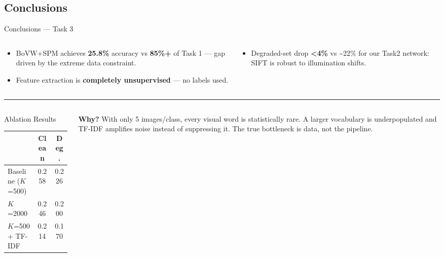 \subsection{Conclusions}
\begin{frame}{Conclusions — Task 3}
  \begin{columns}
    \begin{column}{0.5\textwidth}
      \begin{itemize}
        \item BoVW+SPM achieves \textbf{25.8\%} accuracy vs \textbf{85\%+} of Task 1 — gap driven by the extreme data constraint.
        \item Feature extraction is \textbf{completely unsupervised} — no labels used.
      \end{itemize}
    \end{column}
    \begin{column}{0.5\textwidth}
      \begin{itemize}
        \item Degraded-set drop \textbf{\textless{}4\%} vs \textasciitilde{}22\% for our Task2 network: SIFT is robust to illumination shifts.
      \end{itemize}
    \end{column}
  \end{columns}

  \vspace{0.4em}
  \rule{\textwidth}{0.3pt}
  \vspace{0.2em}

  \begin{columns}
    \begin{column}{0.50\textwidth}
      \begin{alertblock}{Ablation Results}
        \centering
        \small
        \begin{tabular}{lcc}
          & \textbf{Clean} & \textbf{Deg.} \\
          \hline
          Baseline ($K$=500) & 0.258 & 0.226 \\
          $K$=2000           & 0.246 & 0.200 \\
          $K$=500 + TF-IDF   & 0.214 & 0.170 \\
        \end{tabular}
      \end{alertblock}
    \end{column}
    \begin{column}{0.48\textwidth}
      \small
      \textbf{Why?} With only 5 images/class, every visual word is statistically rare.
      A larger vocabulary is underpopulated and TF-IDF amplifies noise instead of suppressing it.
      The true bottleneck is data, not the pipeline.
    \end{column}
  \end{columns}
\end{frame}
